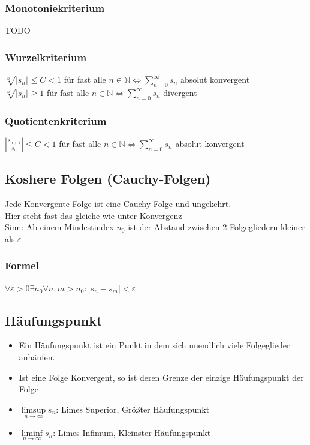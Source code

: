 \documentclass[a4paper,portrait]{scrartcl}
\begin{document}
\subsubsection{Monotoniekriterium}
TODO
\subsubsection{Wurzelkriterium}
$ \sqrt[n]{|s_n|} \leq C < 1 $ für fast alle $ n \in \mathbb{N} \Leftrightarrow \sum_{n=0}^{\infty} s_n$  absolut konvergent\\
$ \sqrt[n]{|s_n|} \geq 1 $ für fast alle $ n \in \mathbb{N} \Leftrightarrow \sum_{n=0}^{\infty} s_n$ divergent \\
\subsubsection{Quotientenkriterium}
$|\frac{s_{n+1}}{s_n}| \leq C < 1$ für fast alle $ n \in \mathbb{N} \Leftrightarrow \sum_{n=0}^{\infty} s_n$  absolut konvergent\\

\subsection{Koshere Folgen (Cauchy-Folgen)}
Jede Konvergente Folge ist eine Cauchy Folge und ungekehrt.\\
Hier steht fast das gleiche wie unter Konvergenz\\
Sinn: Ab einem Mindestindex $n_0$ ist der Abstand zwischen 2 Folgegliedern kleiner als $\varepsilon$
\subsubsection*{Formel}
$ \forall \varepsilon > 0 \exists n_0 \forall n,m > n_0: |s_n - s_m| < \varepsilon$
\subsection{Häufungspunkt}
\begin{itemize}
	\item Ein Häufungspunkt ist ein Punkt in dem sich unendlich viele Folgeglieder anhäufen.
	\item Ist eine Folge Konvergent, so ist deren Grenze der einzige Häufungspunkt der Folge
	\item $\limsup\limits_{n \rightarrow \infty}{s_n}$: Limes Superior, Größter Häufungspunkt
	\item $\liminf\limits_{n \rightarrow \infty}{s_n}$: Limes Infimum, Kleinster Häufungspunkt
\end{itemize}
\end{document}
